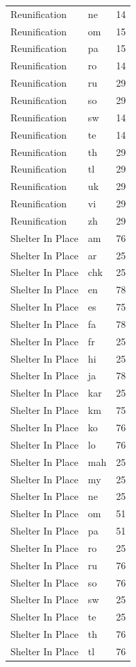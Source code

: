\begin{longtable}{p{3cm} p{3cm} r}
Reunification & ne & 14 \\
Reunification & om & 15 \\
Reunification & pa & 15 \\
Reunification & ro & 14 \\
Reunification & ru & 29 \\
Reunification & so & 29 \\
Reunification & sw & 14 \\
Reunification & te & 14 \\
Reunification & th & 29 \\
Reunification & tl & 29 \\
Reunification & uk & 29 \\
Reunification & vi & 29 \\
Reunification & zh & 29 \\
Shelter In Place & am & 76 \\
Shelter In Place & ar & 25 \\
Shelter In Place & chk & 25 \\
Shelter In Place & en & 78 \\
Shelter In Place & es & 75 \\
Shelter In Place & fa & 78 \\
Shelter In Place & fr & 25 \\
Shelter In Place & hi & 25 \\
Shelter In Place & ja & 78 \\
Shelter In Place & kar & 25 \\
Shelter In Place & km & 75 \\
Shelter In Place & ko & 76 \\
Shelter In Place & lo & 76 \\
Shelter In Place & mah & 25 \\
Shelter In Place & my & 25 \\
Shelter In Place & ne & 25 \\
Shelter In Place & om & 51 \\
Shelter In Place & pa & 51 \\
Shelter In Place & ro & 25 \\
Shelter In Place & ru & 76 \\
Shelter In Place & so & 76 \\
Shelter In Place & sw & 25 \\
Shelter In Place & te & 25 \\
Shelter In Place & th & 76 \\
Shelter In Place & tl & 76 \\

\end{longtable}
